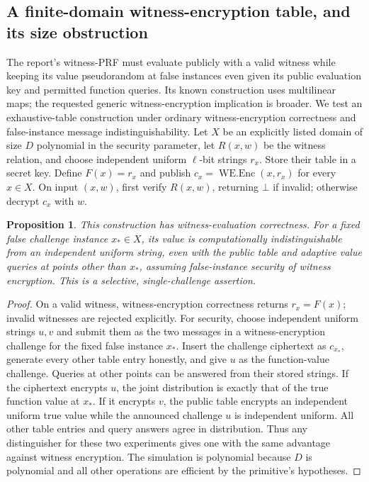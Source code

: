 \documentclass[11pt]{article}
\newtheorem{proposition}{Proposition}
\begin{document}
\subsection{A finite-domain witness-encryption table, and its size obstruction}
The report's witness-PRF must evaluate publicly with a valid witness while keeping its value pseudorandom at false instances even given its public evaluation key and permitted function queries. Its known construction uses multilinear maps; the requested generic witness-encryption implication is broader. We test an exhaustive-table construction under ordinary witness-encryption correctness and false-instance message indistinguishability.
Let $X$ be an explicitly listed domain of size $D$ polynomial in the security parameter, let $R(x,w)$ be the witness relation, and choose independent uniform $\ell$-bit strings $r_x$. Store their table in a secret key. Define $F(x)=r_x$ and publish $c_x=\operatorname{WE.Enc}(x,r_x)$ for every $x\in X$. On input $(x,w)$, first verify $R(x,w)$, returning $\bot$ if invalid; otherwise decrypt $c_x$ with $w$.
\begin{proposition}
This construction has witness-evaluation correctness. For a fixed false challenge instance $x_*\in X$, its value is computationally indistinguishable from an independent uniform string, even with the public table and adaptive value queries at points other than $x_*$, assuming false-instance security of witness encryption. This is a selective, single-challenge assertion.
\end{proposition}
\begin{proof}
On a valid witness, witness-encryption correctness returns $r_x=F(x)$; invalid witnesses are rejected explicitly. For security, choose independent uniform strings $u,v$ and submit them as the two messages in a witness-encryption challenge for the fixed false instance $x_*$. Insert the challenge ciphertext as $c_{x_*}$, generate every other table entry honestly, and give $u$ as the function-value challenge. Queries at other points can be answered from their stored strings. If the ciphertext encrypts $u$, the joint distribution is exactly that of the true function value at $x_*$. If it encrypts $v$, the public table encrypts an independent uniform true value while the announced challenge $u$ is independent uniform. All other table entries and query answers agree in distribution. Thus any distinguisher for these two experiments gives one with the same advantage against witness encryption. The simulation is polynomial because $D$ is polynomial and all other operations are efficient by the primitive's hypotheses.
\end{proof}
\end{document}
